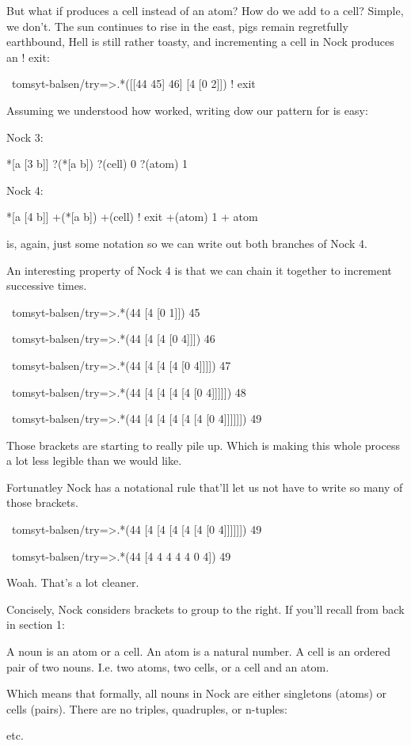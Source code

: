 But what if  produces a cell instead of an atom? How do we
add  to a cell? Simple, we don't. The sun continues to rise in the east,
pigs remain regretfully earthbound, Hell is still rather toasty, and
incrementing a cell in Nock produces an ! exit:
\begin{code}
~tomsyt-balsen/try=>.*([[44 45] 46] [4 [0 2]])
! exit
\end{code}
Assuming we understood how  worked, writing dow our pattern for  is easy:

Nock 3:
\begin{code}
*[a [3 b]]         ?(*[a b])
?(cell)            0
?(atom)            1
\end{code}
Nock 4:
\begin{code}
*[a [4 b]]         +(*[a b])
+(cell)            ! exit
+(atom)            1 + atom
\end{code}
 is, again, just some notation so we can write out both branches of Nock
4.

An interesting property of Nock 4 is that  we can chain it together to
increment successive times.
\begin{code}
~tomsyt-balsen/try=>.*(44 [4 [0 1]])
45

~tomsyt-balsen/try=>.*(44 [4 [4 [0 4]]])
46

~tomsyt-balsen/try=>.*(44 [4 [4 [4 [0 4]]]])
47

~tomsyt-balsen/try=>.*(44 [4 [4 [4 [4 [0 4]]]]])
48

~tomsyt-balsen/try=>.*(44 [4 [4 [4 [4 [4 [0 4]]]]]])
49
\end{code}
Those brackets are starting to really pile up. Which is making this whole
process a lot less legible than we would like.

Fortunatley Nock has a notational rule that'll let us not have to write so many
of those brackets.
\begin{code}
~tomsyt-balsen/try=>.*(44 [4 [4 [4 [4 [4 [0 4]]]]]])
49

~tomsyt-balsen/try=>.*(44 [4 4 4 4 4 0 4])
49
\end{code}
Woah. That's a lot cleaner. 

Concisely, Nock considers brackets to group to the right. If you'll recall from back in section 1:
\begin{code}
A noun is an atom or a cell.
An atom is a natural number.
A cell is an ordered pair of two nouns. I.e. two atoms, two cells, or a cell and an atom.
\end{code}
Which means that formally, all nouns in Nock are either singletons (atoms) or
cells (pairs). There are no triples, quadruples, or n-tuples:
\begin{code}
[a b c]
[a b c d]
[a b c d e]
\end{code}
etc.

